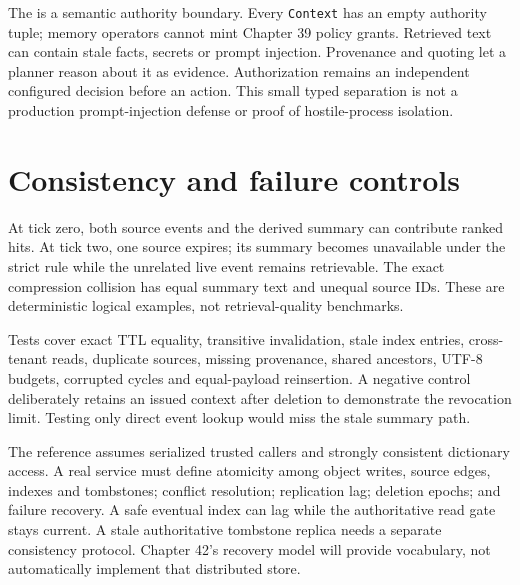 The  is a semantic authority boundary. Every
\texttt{Context} has an empty authority tuple; memory operators cannot mint
Chapter 39 policy grants. Retrieved text can contain stale facts, secrets or
prompt injection. Provenance and quoting let a planner reason about it as
evidence. Authorization remains an independent configured decision before
an action. This small typed separation is not a production prompt-injection
defense or proof of hostile-process isolation.

\section{Consistency and failure controls}
\label{evod40:evidence}
\begin{center}\end{center}
At tick zero, both source events and the derived summary can contribute
ranked hits. At tick two, one source expires; its summary becomes unavailable
under the strict rule while the unrelated live event remains retrievable.
The exact compression collision has equal summary text and unequal source IDs.
These are deterministic logical examples, not retrieval-quality benchmarks.

Tests cover exact TTL equality, transitive invalidation, stale index entries,
cross-tenant reads, duplicate sources, missing provenance, shared ancestors,
UTF-8 budgets, corrupted cycles and equal-payload reinsertion. A negative
control deliberately retains an issued context after deletion to demonstrate
the revocation limit. Testing only direct event lookup would miss the stale
summary path.

The reference assumes serialized trusted callers and strongly consistent
dictionary access. A real service must define atomicity among object writes,
source edges, indexes and tombstones; conflict resolution; replication lag;
deletion epochs; and failure recovery. A safe eventual index can lag while
the authoritative read gate stays current. A stale authoritative tombstone
replica needs a separate consistency protocol. Chapter 42's recovery model
will provide vocabulary, not automatically implement that distributed store.

